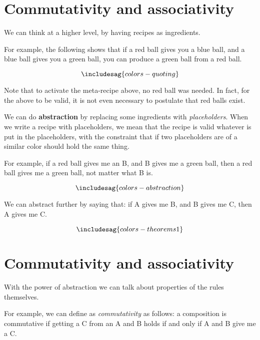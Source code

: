 \section{Commutativity and associativity}

We can think at a higher level, by having recipes as ingredients.

For example, the following shows that if a red ball gives you a blue ball, and a blue ball gives you a green ball, you can produce a green ball from a red ball.


\begin{equation*}
\includesag{colors-quoting}
\end{equation*}


Note that to activate the meta-recipe above, no red ball was needed.
In fact, for the above to be valid, it is not even necessary to postulate that red balls exist.

We can do \textbf{abstraction} by replacing some ingredients with \emph{placeholders}.
When we write a recipe with placeholders, we mean that the recipe is valid whatever is put in the placeholders, with the constraint that if two placeholders are of a similar color should hold the same thing.

For example, if a red ball gives me an B, and B gives me a green ball, then a red ball gives me a green ball, not matter what B is.

\begin{equation*}
  \includesag{colors-abstraction}
\end{equation*}


We can abstract further by saying that: if A gives me B, and B gives me C, then A gives me C.

\begin{equation*}
  \includesag{colors-theorems1}
\end{equation*}



\section{Commutativity and associativity}

With the power of abstraction we can talk about properties of the rules themselves.

For example, we can define as \emph{commutativity} as follows: a composition is commutative if getting a C from an A and B holds if and only if A and B give me a C.

